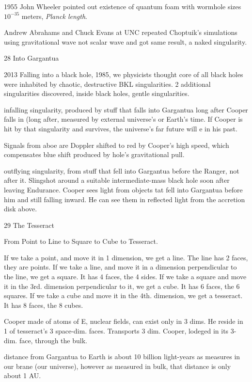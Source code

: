 \documentclass[10pt]{amsart}
\begin{document}
1955 John Wheeler pointed out existence of quantum foam with wormhole sizes $10^{-35}$ meters, \emph{Planck length}.

Andrew Abrahams and Chuck Evans at UNC repeated Choptuik's simulations using gravitational wave not scalar wave and got same result, a naked singularity.

28 Into Gargantua

2013 Falling into a black hole, 1985, we physicists thought core of all black holes were inhabited by chaotic, destructive BKL singularities. 2 additional singularities discovered, inside black holes, gentle singularities.

infalling singularity, produced by stuff that falls into Gargantua long after Cooper falls in (long after, measured by external universe's or Earth's time. If Cooper is hit by that singularity and survives, the universe's far future will e in his past.

Signals from aboe are Doppler shifted to red by Cooper's high speed, which compensates blue shift produced by hole's gravitational pull.

outflying singularity, from stuff that fell into Gargantua before the Ranger, not after it. Slingshot around a suitable intermediate-mass black hole soon after leaving Endurance.
Cooper sees light from objects tat fell into Gargantua before him and still falling inward. He can see them in reflected light from the accretion disk above.

29 The Tesseract

From Point to Line to Square to Cube to Tesseract.

If we take a point, and move it in 1 dimension, we get a line. The line has 2 faces, they are points.
If we take a line, and move it in a dimension perpendicular to the line, we get a square. It has 4 faces, the 4 sides.
If we take a square and move it in the 3rd. dimension perpendicular to it, we get a cube. It has 6 faces, the 6 squares.
If we take a cube and move it in the 4th. dimension, we get a tesseract. It has 8 faces, the 8 cubes.

Cooper made of atoms of E, nuclear fields, can exist only in 3 dims. He reside in 1 of tesseract's 3 space-dim. faces.
Transports 3 dim. Cooper, lodeged in its 3-dim. face, through the bulk.

distance from Gargantua to Earth is about 10 billion light-years as measures in our brane (our universe), however as measured in bulk, that distance is only about 1 AU.
\end{document}
